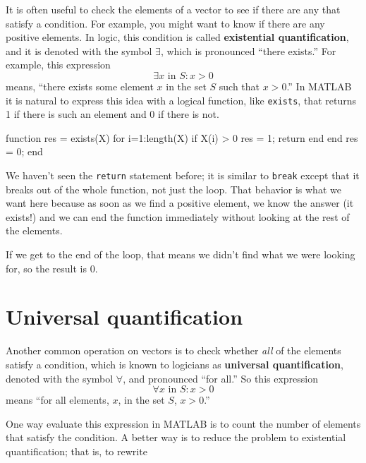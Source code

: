 \documentclass[
]{book}
\numberwithin{Answer}{chapter}
\numberwithin{Exercise}{chapter}
\begin{document}

It is often useful to check the elements of a vector to see if there
are any that satisfy a condition.  For example, you might want to
know if there are any positive elements.  In logic, this condition
is called {\bf existential quantification}, and it is denoted with
the symbol $\exists$, which is pronounced ``there exists.''  For example,
this expression
%
\[ \exists x \mbox{~in~} S: x>0  \]
%
means, ``there exists some element $x$ in the set $S$ such that
$x>0$.''  In MATLAB it is natural to express this idea with a logical
function, like {\tt exists}, that returns 1 if there is such an
element and 0 if there is not.

\begin{code}
function res = exists(X)
    for i=1:length(X)
        if X(i) > 0
            res = 1;
            return
        end
    end
    res = 0;
end
\end{code}

We haven't seen the {\tt return} statement before; it is similar
to {\tt break} except that it breaks out of the whole function, not
just the loop.  That behavior is what we want here because as soon
as we find a positive element, we know the answer (it exists!) and
we can end the function immediately without looking at the rest
of the elements.


If we get to the end of the loop, that means we didn't find what
we were looking for, so the result is 0.



\section{Universal quantification}


Another common operation on vectors is to check whether {\em all}
of the elements satisfy a condition, which is known to
logicians as {\bf universal quantification}, denoted with
the symbol $\forall$, and pronounced ``for all.''  So this
expression
%
\[ \forall x \mbox{~in~} S: x>0 \]
%
means ``for all elements, $x$, in the set $S$, $x>0$.''

One way evaluate this expression in MATLAB is to
count the number of elements that satisfy the condition.
A better way is to reduce the problem to
existential quantification; that is, to rewrite
\end{document}
